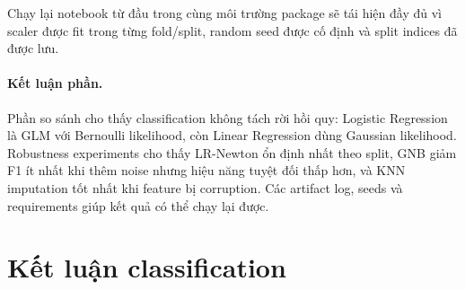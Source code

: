 \documentclass[12pt,a4paper]{article}
\begin{document}
\begin{table}[htbp]
\centering
\caption{Runtime/memory mean trong các kịch bản chính.}
\end{table}

Chạy lại notebook từ đầu trong cùng môi trường package sẽ tái hiện đầy đủ vì scaler được fit trong từng fold/split, random seed được cố định và split indices đã được lưu.

\paragraph{Kết luận phần.}
Phần so sánh cho thấy classification không tách rời hồi quy: Logistic Regression là GLM với Bernoulli likelihood, còn Linear Regression dùng Gaussian likelihood. Robustness experiments cho thấy LR-Newton ổn định nhất theo split, GNB giảm F1 ít nhất khi thêm noise nhưng hiệu năng tuyệt đối thấp hơn, và KNN imputation tốt nhất khi feature bị corruption. Các artifact log, seeds và requirements giúp kết quả có thể chạy lại được.

\section{Kết luận classification}
\end{document}
